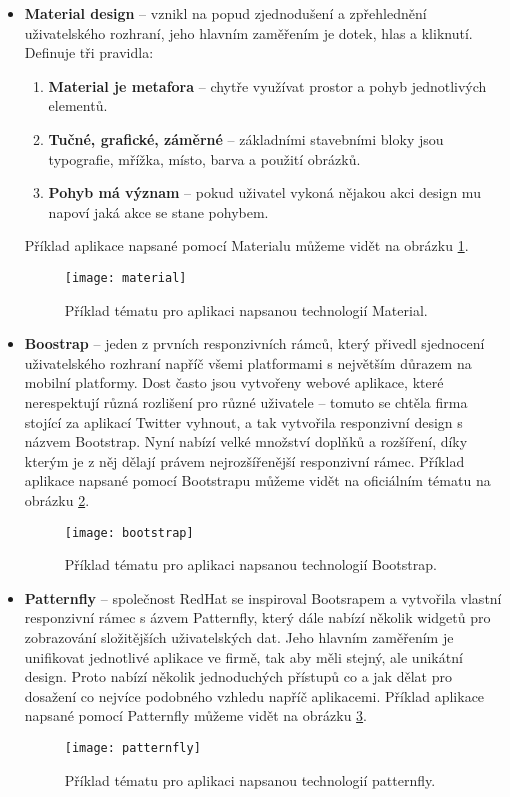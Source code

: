 \begin{itemize}
\item \textbf{Material design} -- vznikl na popud zjednodušení a zpřehlednění uživatelského rozhraní, jeho hlavním zaměřením je dotek, hlas a kliknutí. Definuje tři pravidla:
\begin{enumerate}
  \item \textbf{Material je metafora} -- chytře využívat prostor a pohyb jednotlivých elementů.
  \item \textbf{Tučné, grafické, záměrné} -- základními stavebními bloky jsou typografie, mřížka, místo, barva a použití obrázků.
  \item \textbf{Pohyb má význam} -- pokud uživatel vykoná nějakou akci design mu napoví jaká akce se stane pohybem. \cite{material}
\end{enumerate}
Příklad aplikace napsané pomocí Materialu můžeme vidět na obrázku \ref{material-fig}.

\begin{figure}[h!]
\centering
\texttt{[image: material]}
\caption{Příklad tématu pro aplikaci napsanou technologií Material.}
\label{material-fig}
\end{figure}

\item \textbf{Boostrap} -- jeden z prvních responzivních rámců, který přivedl sjednocení uživatelského rozhraní napříč všemi platformami s největším důrazem na mobilní platformy. Dost často jsou vytvořeny webové aplikace, které nerespektují různá rozlišení pro různé uživatele -- tomuto se chtěla firma stojící za aplikací Twitter vyhnout, a tak vytvořila responzivní design s názvem Bootstrap. Nyní nabízí velké množství doplňků a rozšíření, díky kterým je z něj dělají právem nejrozšířenější responzivní rámec. \cite{bootstrap} Příklad aplikace napsané pomocí Bootstrapu můžeme vidět na oficiálním tématu na obrázku \ref{bootstrap-fig}.

\begin{figure}[h!]
\centering
\texttt{[image: bootstrap]}
\caption{Příklad tématu pro aplikaci napsanou technologií Bootstrap.}
\label{bootstrap-fig}
\end{figure}
\newpage
\item \textbf{Patternfly} -- společnost RedHat se inspiroval Bootsrapem a vytvořila vlastní responzivní rámec s  ázvem Patternfly, který dále nabízí několik widgetů pro zobrazování složitějších uživatelských dat. Jeho hlavním zaměřením je unifikovat jednotlivé aplikace ve firmě, tak aby měli stejný, ale unikátní design. Proto nabízí několik jednoduchých přístupů co a jak dělat pro dosažení co nejvíce podobného vzhledu napříč aplikacemi. \cite{patternfly} Příklad aplikace napsané pomocí Patternfly můžeme vidět na obrázku \ref{patternfly-fig}.

\begin{figure}[h!]
\centering
\texttt{[image: patternfly]}
\caption{Příklad tématu pro aplikaci napsanou technologií patternfly.}
\label{patternfly-fig}
\end{figure}
\end{itemize}

